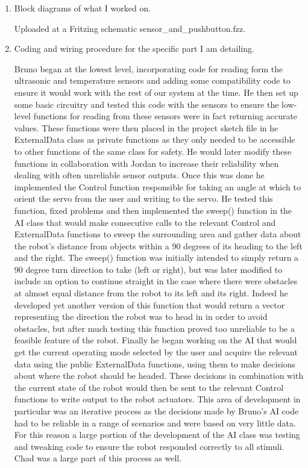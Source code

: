 \documentclass[letterpaper,12pt]{article}
\begin{document}
\begin{enumerate}
\item Block diagrams of what I worked on.

Uploaded at a Fritzing schematic sensor_and_pushbutton.fzz.
 
\item Coding and wiring procedure for the specific part I am detailing.
 
Bruno began at the lowest level, incorporating code for reading form the ultrasonic and temperature sensors and adding some compatibility code to ensure it would work with the rest of our system at the time. He then set up some basic circuitry and tested this code with the sensors to ensure the low-level functions for reading from these sensors were in fact returning accurate values. These functions were then placed in the project sketch file in he ExternalData class as private functions as they only needed to be accessible to other functions of the same class for safety. He would later modify these functions in collaboration with Jordan to increase their reliability when dealing with often unreliable sensor outputs. Once this was done he implemented the Control function responsible for taking an angle at which to orient the servo from the user and writing to the servo. He tested this function, fixed problems and then implemented the sweep() function in the AI class that would make consecutive calls to the relevant Control and ExternalData functions to sweep the surrounding area and gather data about the robot's distance from objects within a 90 degrees of its heading to the left and the right. The sweep() function was initially intended to simply return a 90 degree turn direction to take (left or right), but was later modified to include an option to continue straight in the case where there were obstacles at almost equal distance from the robot to its left and its right. Indeed he developed yet another version of this function that would return a vector representing the direction the robot was to head in in order to avoid obstacles, but after much testing this function proved too unreliable to be a feasible feature of the robot. Finally he began working on the AI that would get the current operating mode selected by the user and acquire the relevant data using the public ExternalData functions, using them to make decisions about where the robot should be headed. These decisions in combination with the current state of the robot would then be sent to the relevant Control functions to write output to the robot actuators. This area of development in particular was an iterative process as the decisions made by Bruno's AI code had to be reliable in a range of scenarios and were based on very little data. For this reason a large portion of the development of the AI class was testing and tweaking code to ensure the robot responded correctly to all stimuli. Chad was a large part of this process as well.  


\end{enumerate}
\end{document}
